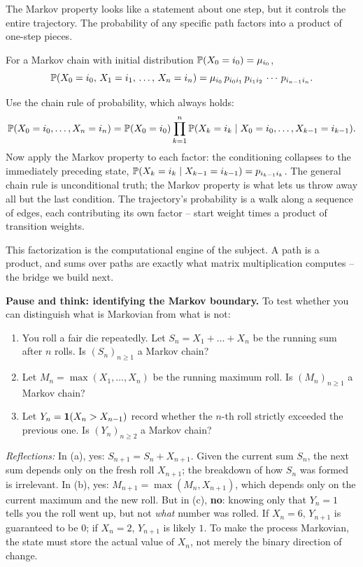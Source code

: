 The Markov property looks like a statement about one step, but it controls the entire
trajectory. The probability of any specific path factors into a product of one-step pieces.

\begin{proposition}
\label{ch23:path-factorization}
For a Markov chain with initial distribution $\P(X_0 = i_0) = \mu_{i_0}$,
\[
  \P(X_0 = i_0,\, X_1 = i_1,\, \dots,\, X_n = i_n)
   = \mu_{i_0}\, p_{i_0 i_1}\, p_{i_1 i_2}\, \cdots\, p_{i_{n-1} i_n}.
\]
\end{proposition}

\begin{whybox}
Use the chain rule of probability, which always holds:
\[
  \P(X_0=i_0,\dots,X_n=i_n) = \P(X_0=i_0)\prod_{k=1}^{n}\P(X_k=i_k \given X_0=i_0,\dots,X_{k-1}=i_{k-1}).
\]
Now apply the Markov property to each factor: the conditioning collapses to the immediately
preceding state, $\P(X_k=i_k \given X_{k-1}=i_{k-1}) = p_{i_{k-1}i_k}$. The general chain
rule is unconditional truth; the Markov property is what lets us throw away all but the last
condition. The trajectory's probability is a walk along a sequence of edges, each
contributing its own factor -- start weight times a product of transition weights.
\end{whybox}

This factorization is the computational engine of the subject. A path is a product, and sums
over paths are exactly what matrix multiplication computes -- the bridge we build next.

\begin{recoverybox}
\textbf{Pause and think: identifying the Markov boundary.}
To test whether you can distinguish what is Markovian from what is not:
\begin{enumerate}[label=(\alph*)]
  \item You roll a fair die repeatedly. Let $S_n = X_1 + \dots + X_n$ be the running sum after $n$ rolls. Is $(S_n)_{n \ge 1}$ a Markov chain?
  \item Let $M_n = \max(X_1, \dots, X_n)$ be the running maximum roll. Is $(M_n)_{n \ge 1}$ a Markov chain?
  \item Let $Y_n = \ind(X_n > X_{n-1})$ record whether the $n$-th roll strictly exceeded the previous one. Is $(Y_n)_{n \ge 2}$ a Markov chain?
\end{enumerate}
\emph{Reflections:} In (a), yes: $S_{n+1} = S_n + X_{n+1}$. Given the current sum $S_n$, the next sum depends only on the fresh roll $X_{n+1}$; the breakdown of how $S_n$ was formed is irrelevant. In (b), yes: $M_{n+1} = \max(M_n, X_{n+1})$, which depends only on the current maximum and the new roll. But in (c), \textbf{no}: knowing only that $Y_n = 1$ tells you the roll went up, but not \emph{what} number was rolled. If $X_n = 6$, $Y_{n+1}$ is guaranteed to be $0$; if $X_n = 2$, $Y_{n+1}$ is likely $1$. To make the process Markovian, the state must store the actual value of $X_n$, not merely the binary direction of change.
\end{recoverybox}

